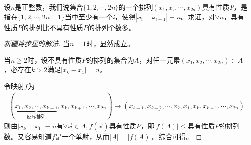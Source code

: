 \begin{example}[IMO 1989]
  设$n$是正整数，我们说集合$\{1,2,\cdots,2n\}$的一个排列$(x_1,x_2,\cdots,x_{2n})$具有性质$P$，是指在$\{1,2,\cdots,2n-1\}$当中至少有一个$i$，使得$|x_i-x_{i+1}|=n$。求证，对$\forall n$，具有性质$P$的排列比不具有性质$P$的排列个数多。
\end{example}
\begin{proof}[新疆蒋步星的解法]
  当$n=1$时，显然成立。

  当$n\ge 2$时，设不具有性质$P$的排列的集合为$A$，对任一元素$(x_1,x_2,\cdots,x_{2n})\in A$，必存在$k>2$满足$|x_k-x_1|=n$。

  令映射$f$为
  \begin{align*}
    (\underbrace{x_1,x_2,\cdots,x_{k-1}}_{\text{反序排列}},x_k,x_{k+1},\cdots,x_{2n}) \to
    (\underline{x_{k-1}, x_{k-2}, \cdots, x_2, x_1}, x_k, x_{k+1},\cdots,x_{2n})
  \end{align*}
  则由$|x_k-x_1|=n$有$\forall \vec x \in A, f(\vec x)$具有性质$P$，即$|f(A)|\le $具有性质$P$的排列数。又容易知道$f$是一个单射，从而$|A| = |f(A)|$。综合可得。
\end{proof}

